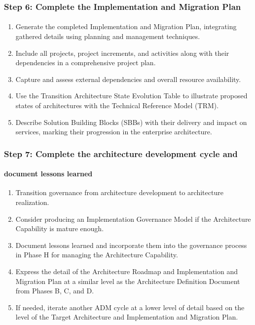 \documentclass[aspectratio=169, table]{beamer}
\begin{document}
	\begin{frame}
		\frametitle{Step 6: Complete the Implementation and Migration Plan}
		\framesubtitle{\hspace{1cm}}
	\vspace{20pt}
		\begin{enumerate}
			\item Generate the completed Implementation and Migration Plan, integrating gathered details using planning and management techniques.
			\item Include all projects, project increments, and activities along with their dependencies in a comprehensive project plan.
			\item Capture and assess external dependencies and overall resource availability.
			\item Use the Transition Architecture State Evolution Table to illustrate proposed states of architectures with the Technical Reference Model (TRM).
			\item Describe Solution Building Blocks (SBBs) with their delivery and impact on services, marking their progression in the enterprise architecture.
		\end{enumerate}
\end{frame}

	\begin{frame}
	\frametitle{Step 7: Complete the architecture development cycle and }
	\framesubtitle{document lessons learned}
	\vspace{20pt}
		\begin{enumerate}
			\item Transition governance from architecture development to architecture realization.
			\item Consider producing an Implementation Governance Model if the Architecture Capability is mature enough.
			\item Document lessons learned and incorporate them into the governance process in Phase H for managing the Architecture Capability.
			\item Express the detail of the Architecture Roadmap and Implementation and Migration Plan at a similar level as the Architecture Definition Document from Phases B, C, and D.
			\item If needed, iterate another ADM cycle at a lower level of detail based on the level of the Target Architecture and Implementation and Migration Plan.
		\end{enumerate}
\end{frame}
\end{document}

